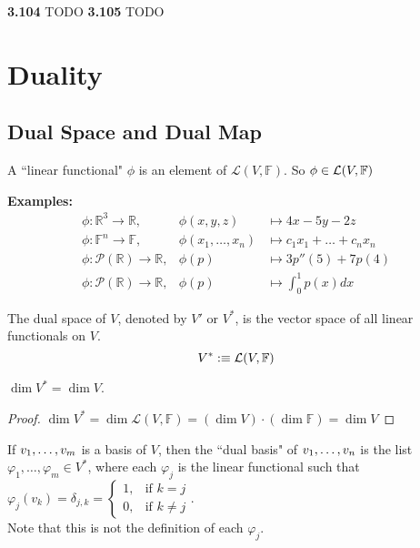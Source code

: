 \textbf{3.104} TODO \textbf{3.105} TODO \\

 \filbreak
\section{Duality}
\subsection{Dual Space and Dual Map}

\setcounter{thm}{107}
\begin{mydef}
    A ``linear functional" $\phi$ is an element of $\mathcal{L}(V, \mathbb{F})$. So $\phi \in \mathcal{L}(V, \mathbb{F})$
\end{mydef}

\textbf{Examples:}
\begin{equation}
	\begin{array}{lll}
		\phi: \mathbb{R}^3  \to \mathbb{R}, &\phi (x,y,z)  & \mapsto 4x-5y-2z \\
		\phi: \mathbb{F}^n  \to \mathbb{F}, &\phi (x_1, \dots, x_n)
		& \mapsto c_1x_1 + \dots + c_nx_n  \\
		\phi: \mathcal{P} (\mathbb{R})  \to \mathbb{R},
		& \phi(p) & \mapsto 3p''(5) + 7p(4) \\
		\phi: \mathcal{P}(\mathbb{R}) \to \mathbb{R},
		& \phi(p)  &\mapsto \textstyle \int_{0}^{1} p(x) dx
	\end{array}
\end{equation}

\setcounter{thm}{109}
\begin{thm}
    The dual space of $V$, denoted by $V'$ or $V^{*}$, is the vector space of all linear functionals on $V$.
    \begin{equation}
        V^{*} :\equiv \mathcal{L}(V, \mathbb{F})
    \end{equation}
\end{thm}

\begin{thm}
    $\dim V^{*} = \dim V$.
\end{thm}
\begin{proof}
    $\dim V^{*} = \dim \mathcal{L}(V, \mathbb{F})=(\dim V) \cdot (\dim \mathbb{F}) = \dim V $
\end{proof}


\begin{mydef}
    If $v_1, \dots, v_m$ is a basis of $V$, then the ``dual basis" of $v_1, \dots, v_n$ is the list $\varphi_1, \dots, \varphi_m \in V^{*}$, where each $\varphi_j$ is the linear functional such that
$\varphi_j(v_k) = \delta_{j,k} =
\begin{cases}
	1,  & \text{if $k=j$} \\
	0, & \text{if $k \neq j$}
\end{cases}$. \\
Note that this is not the definition of each $\varphi_j$.
\end{mydef}

